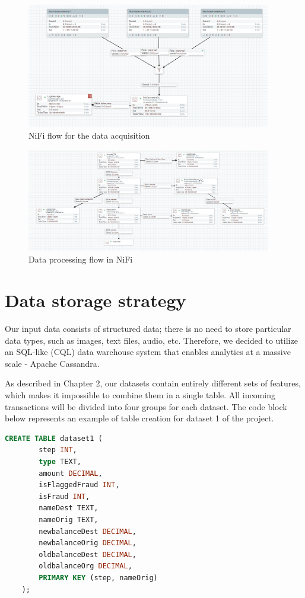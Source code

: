 \documentclass[12pt,a4paper, hidelinks]{article}
\begin{document}
\begin{figure}[h!]
    \centering
    \includegraphics[width=0.95\textwidth]{images/m2-nifi-1.png}
    \caption{NiFi flow for the data acquisition}
    \label{fig:nifi1}
\end{figure}
\begin{figure}[h!]
    \centering
    \includegraphics[width=0.95\textwidth]{images/m2-nifi-2.png}
    \caption{Data processing flow in NiFi}
    \label{fig:nifi2}
\end{figure}
\section{Data storage strategy}

Our input data consists of structured data; there is no need to store particular data types, such as images, text files, audio, etc. Therefore, we decided to utilize an SQL-like (CQL) data warehouse system that enables analytics at a massive scale - Apache Cassandra.

As described in Chapter 2, our datasets contain entirely different sets of features, which makes it impossible to combine them in a single table. All incoming transactions will be divided into four groups for each dataset. The code block below represents an example of table creation for dataset 1 of the project.


\begin{lstlisting}[language=SQL, caption=Apache Cassandra table creation]
    CREATE TABLE dataset1 (
        step INT,
        type TEXT,
        amount DECIMAL,
        isFlaggedFraud INT,
        isFraud INT,
        nameDest TEXT,
        nameOrig TEXT,
        newbalanceDest DECIMAL,
        newbalanceOrig DECIMAL,
        oldbalanceDest DECIMAL,
        oldbalanceOrg DECIMAL,
        PRIMARY KEY (step, nameOrig)
    );
\end{lstlisting}
\end{document}
